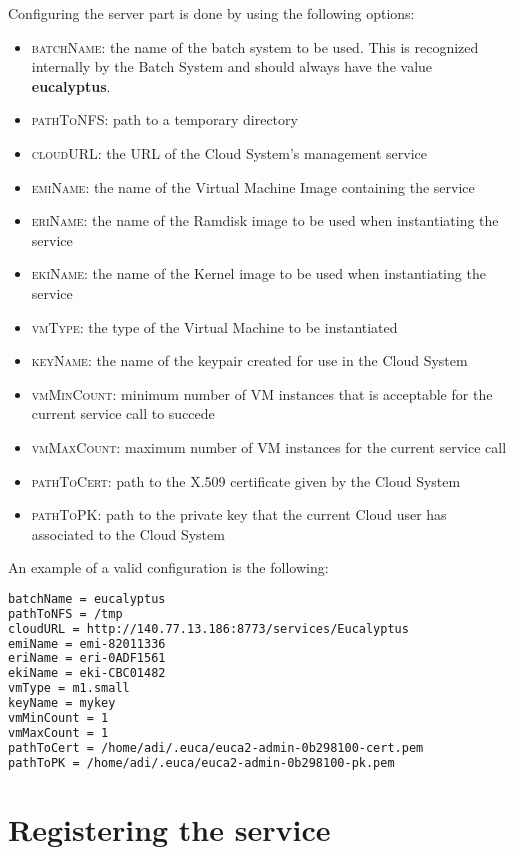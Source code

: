 \noindent
Configuring the server part is done by using the following options:
\begin{itemize}
\item \textsc{batchName}: the name of the batch system to be used. This is recognized internally by the
\diet Batch System and should always have the value \textbf{eucalyptus}.
\item \textsc{pathToNFS}: path to a temporary directory
\item \textsc{cloudURL}: the URL of the Cloud System's management service
\item \textsc{emiName}: the name of the Virtual Machine Image containing the service
\item \textsc{eriName}: the name of the Ramdisk image to be used when instantiating the service
\item \textsc{ekiName}: the name of the Kernel image to be used when instantiating the service
\item \textsc{vmType}: the type of the Virtual Machine to be instantiated
\item \textsc{keyName}: the name of the keypair created for use in the Cloud System
\item \textsc{vmMinCount}: minimum number of VM instances that is acceptable for the current service call to succede
\item \textsc{vmMaxCount}: maximum number of VM instances for the current service call
\item \textsc{pathToCert}: path to the X.509 certificate given by the Cloud System
\item \textsc{pathToPK}: path to the private key that the current Cloud user has associated to the Cloud System
\end{itemize}

An example of a valid configuration is the following:
\begin{lstlisting}[language=bash,basewidth={.5em,.4em},fontadjust]
batchName = eucalyptus
pathToNFS = /tmp
cloudURL = http://140.77.13.186:8773/services/Eucalyptus
emiName = emi-82011336
eriName = eri-0ADF1561
ekiName = eki-CBC01482 
vmType = m1.small
keyName = mykey
vmMinCount = 1
vmMaxCount = 1
pathToCert = /home/adi/.euca/euca2-admin-0b298100-cert.pem
pathToPK = /home/adi/.euca/euca2-admin-0b298100-pk.pem
\end{lstlisting}

\section{Registering the service}

